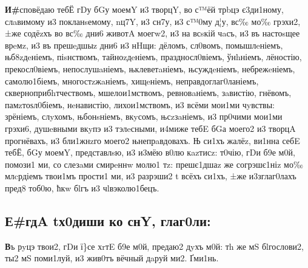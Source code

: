 \textbf{И\#}сповёдаю тебЁ гDу бGу моемY и3 творцY, во с™ёй трbцэ є3ди1ному,
слaвимому и3 покланsемому, nц7Y, и3 сн7у, и3 с™0му д¦у, вс‰ мо‰ грэхи2,
±же содёzхъ во вс‰ дни6 животA моегw2, и3 на всsкій чaсъ, и3 въ
настоsщее врeмz, и3 въ прешeдшыz дни6 и3 нHщи: дёломъ, сл0вомъ,
помышлeніемъ, њб8zдeніемъ, піsнствомъ, тайноzдeніемъ, праздносл0віемъ,
ўнhніемъ, лёностію, прекосл0віемъ, непослушaніемъ, њклеветaніемъ,
њсуждeніемъ, небрежeніемъ, самолю1біемъ, многостzжaніемъ, хищeніемъ,
неправдоглаг0ланіемъ, скверноприбhтчествомъ, мшелои1мствомъ,
ревновaніемъ, зaвистію, гнёвомъ, памzтоѕл0біемъ, нeнавистію,
лихои1мствомъ, и3 всёми мои1ми чyвствы: зрёніемъ, слyхомъ, њбонsніемъ,
вкyсомъ, њсzзaніемъ, и3 пр0чими мои1ми грэхи6, душeвными вкyпэ и3
тэлeсными, и4миже тебE бGа моего2 и3 творцA прогнёвахъ, и3 бли1жнzго
моего2 њнепрaвдовахъ. Њ си1хъ жалёz, ви1нна себE тебЁ, бGу моемY,
представлsю, и3 и3мёю в0лю кazтисz: т0чію, гDи б9е м0й, помози1 ми, со
слезaми смирeннw молю1 тz: прешє1дшаz же согрэшє1ніz мо‰ млcрдіемъ
твои1мъ прости1 ми, и3 разрэши2 t всёхъ си1хъ, ±же и3зглаг0лахъ пред8
тоб0ю, ћкw бlгъ и3 чlвэколю1бецъ.

\subsection{Е\#гдA tх0диши ко снY, глаг0ли:}

\textbf{В}ъ рyцэ твои2, гDи ї\}се хrтE б9е м0й, предаю2 дyхъ м0й: тh же мS
бlгослови2, ты2 мS поми1луй, и3 жив0тъ вёчный дaруй ми2. Ґми1нь.

